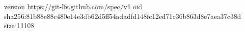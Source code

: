 version https://git-lfs.github.com/spec/v1
oid sha256:81b88e88c480e14e3db62d5ff54adadfd148fc12ed71c36b863d8e7aea37c38d
size 11108
